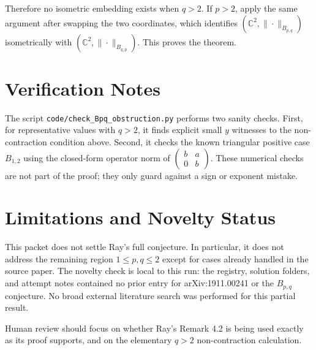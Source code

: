 \documentclass[11pt]{article}
\newcommand{\C}{\mathbb C}
\begin{document}
Therefore no isometric embedding exists when \(q>2\).  If \(p>2\), apply the
same argument after swapping the two coordinates, which identifies
\((\C^2,\|\cdot\|_{B_{p,q}})\) isometrically with
\((\C^2,\|\cdot\|_{B_{q,p}})\).  This proves the theorem.

\section{Verification Notes}

The script \texttt{code/check\_Bpq\_obstruction.py} performs two sanity
checks.  First, for representative values with \(q>2\), it finds explicit
small \(y\) witnesses to the non-contraction condition above.  Second, it
checks the known triangular positive case \(B_{1,2}\) using the closed-form
operator norm of \(\begin{pmatrix} b&a\\0&b\end{pmatrix}\).  These numerical
checks are not part of the proof; they only guard against a sign or exponent
mistake.

\section{Limitations and Novelty Status}

This packet does not settle Ray's full conjecture.  In particular, it does
not address the remaining region \(1\leq p,q\leq2\) except for cases already
handled in the source paper.  The novelty check is local to this run:
the registry, solution folders, and attempt notes contained no prior entry
for arXiv:1911.00241 or the \(B_{p,q}\) conjecture.  No broad external
literature search was performed for this partial result.

Human review should focus on whether Ray's Remark 4.2 is being used exactly
as its proof supports, and on the elementary \(q>2\) non-contraction
calculation.
\end{document}
